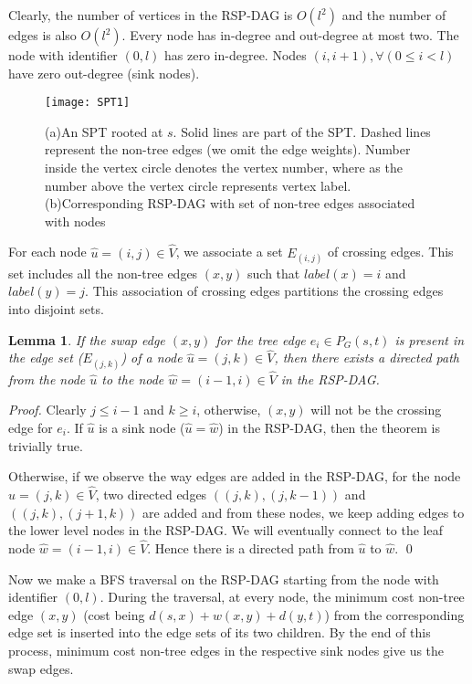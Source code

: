 \documentclass[11pt,a4paper]{llncs}
\newtheorem{lem}[thm]{Lemma}
\begin{document}
Clearly, the number of vertices in the RSP-DAG is $O(l^2)$ and the number of edges is also
$O(l^2)$. Every node has in-degree and out-degree at most two.
The node with identifier $(0,l)$ has zero in-degree. Nodes $(i, i+1), \forall (0 \leq i < l)$
have zero out-degree (sink nodes).

\begin{figure}[!ht]
\centering
\texttt{[image: SPT1]}
\caption{(a)An SPT rooted at $s$. Solid lines are part of the SPT. Dashed lines represent
the non-tree edges (we omit the edge weights). Number inside the vertex circle denotes the vertex number, where as
the number above the vertex circle represents vertex label.\newline
(b)Corresponding RSP-DAG with set of non-tree edges associated with nodes} \label{fig2}
\end{figure}

For each node $\widehat{u}=(i,j) \in \widehat{V}$, we associate a set $E_{(i,j)}$ of crossing edges.
This set includes all the non-tree edges $(x,y)$ such that $label(x)=i$ and $label(y)=j$.
This association of crossing edges partitions the crossing edges into disjoint sets.

\begin{lem}
If the swap edge $(x,y)$ for the tree edge $e_{i} \in P_{G}(s,t)$ is present in
the edge set ($E_{(j,k)}$) of a node $\widehat{u} = (j, k) \in \widehat{V}$, then there exists a directed path
from the node $\widehat{u}$ to the node $\widehat{w} = (i-1,i) \in \widehat{V}$ in the RSP-DAG.
\end{lem}
\begin{proof}
Clearly $j \leq i-1$ and $k \geq i$, otherwise, $(x,y)$ will not be the crossing
edge for $e_{i}$. If $\widehat{u}$ is a sink node ($\widehat{u} = \widehat{w}$) in the RSP-DAG, then
the theorem is trivially true.

Otherwise, if we observe the way edges are added in the RSP-DAG, for the node
$\widehat{u} = (j, k) \in \widehat{V}$, two directed edges $((j,k), (j,k-1))$ and $((j,k), (j+1,k))$
are added and from these nodes, we keep adding edges to the lower level nodes in the RSP-DAG. We will
eventually connect to the leaf node $\widehat{w} = (i-1,i) \in \widehat{V}$. Hence there is
a directed path from $\widehat{u}$ to $\widehat{w}$.
\qed
\end{proof}

Now we make a BFS traversal on the RSP-DAG starting from the node with identifier
$(0,l)$. During the traversal, at every node, the minimum cost non-tree edge $(x,y)$
(cost being $d(s,x) + w(x,y) + d(y,t)$) from the corresponding edge set is inserted into the edge sets of its
two children. By the end of this process, minimum cost non-tree edges in the respective
sink nodes give us the swap edges.
\end{document}
